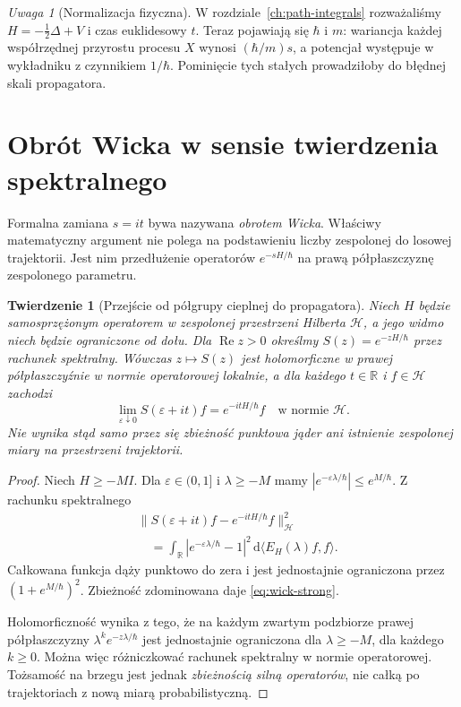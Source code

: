 \documentclass[11pt,a4paper,oneside]{report}
\numberwithin{equation}{chapter}
\theoremstyle{plain}
\newtheorem{twierdzenie}{Twierdzenie}[chapter]
\theoremstyle{definition}
\theoremstyle{remark}
\newtheorem{uwaga}{Uwaga}[chapter]
\newcommand{\R}{\mathbb{R}}
\newcommand{\calH}{\mathcal{H}}
\newcommand{\dd}{\mathrm{d}}
\begin{document}
\begin{uwaga}[Normalizacja fizyczna]
W rozdziale~\ref{ch:path-integrals} rozważaliśmy
$H=-\frac12\Delta+V$ i czas euklidesowy $t$.
Teraz pojawiają się $\hbar$ i $m$: wariancja każdej
współrzędnej przyrostu procesu $X$ wynosi
$(\hbar/m)s$, a potencjał występuje w wykładniku
z czynnikiem $1/\hbar$. Pominięcie tych stałych
prowadziłoby do błędnej skali propagatora.
\end{uwaga}

\section{Obrót Wicka w sensie twierdzenia spektralnego}\label{sec:volIII:16:03}

Formalna zamiana $s=it$ bywa nazywana \emph{obrotem Wicka}.
Właściwy matematyczny argument nie polega na
podstawieniu liczby zespolonej do losowej trajektorii.
Jest nim przedłużenie operatorów
$e^{-sH/\hbar}$ na prawą półpłaszczyznę
zespolonego parametru.

\begin{twierdzenie}[Przejście od półgrupy cieplnej do propagatora]\label{thm:volIII:16:02}
\label{th:wick-spectral}
Niech $H$ będzie samosprzężonym operatorem w zespolonej
przestrzeni Hilberta $\calH$, a jego widmo niech będzie
ograniczone od dołu. Dla $\operatorname{Re}z>0$ określmy
$S(z)=e^{-zH/\hbar}$ przez rachunek spektralny.
Wówczas $z\mapsto S(z)$ jest holomorficzne w prawej
półpłaszczyźnie w normie operatorowej lokalnie, a dla
każdego $t\in\R$ i $f\in\calH$ zachodzi
\[
 \lim_{\varepsilon\downarrow0}
  S(\varepsilon+it)f=e^{-itH/\hbar}f
  \quad\text{w normie }\calH.
\tag{16.5}\label{eq:wick-strong}
\]
Nie wynika stąd samo przez się zbieżność punktowa jąder
ani istnienie zespolonej miary na przestrzeni trajektorii.
\end{twierdzenie}
\begin{proof}
Niech $H\ge-MI$. Dla $\varepsilon\in(0,1]$ i
$\lambda\ge-M$ mamy $|e^{-\varepsilon\lambda/\hbar}|
\le e^{M/\hbar}$. Z rachunku spektralnego
\[
\begin{split}
&\|S(\varepsilon+it)f-e^{-itH/\hbar}f\|_{\calH}^2\\
&\quad=\int_{\R}\left|e^{-\varepsilon\lambda/\hbar}-1\right|^2
 \,\dd\langle E_H(\lambda)f,f\rangle.
\end{split}
\]
Całkowana funkcja dąży punktowo do zera i jest
jednostajnie ograniczona przez $(1+e^{M/\hbar})^2$.
Zbieżność zdominowana daje \eqref{eq:wick-strong}.

Holomorficzność wynika z tego, że na każdym zwartym
podzbiorze prawej półpłaszczyzny
$\lambda^k e^{-z\lambda/\hbar}$ jest jednostajnie
ograniczona dla $\lambda\ge-M$, dla każdego $k\ge0$.
Można więc różniczkować rachunek spektralny w normie
operatorowej. Tożsamość na brzegu jest jednak
\emph{zbieżnością silną operatorów}, nie całką po
trajektoriach z nową miarą probabilistyczną.
\end{proof}
\end{document}
